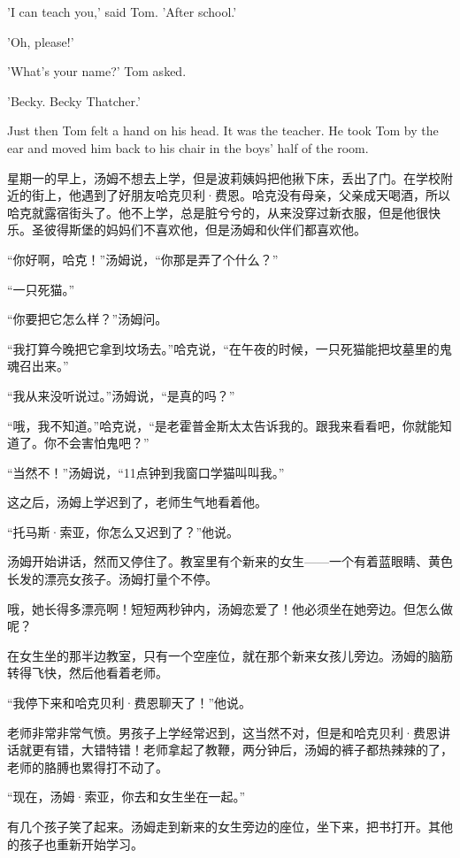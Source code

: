 \documentclass[fontset=ubuntu, zihao=5]{ctexart}
\begin{document}
\begin{paracol}{2}
'I can teach you,' said Tom. 'After school.'



'Oh, please!'

'What's your name?' Tom asked.

'Becky. Becky Thatcher.'

Just then Tom felt a hand on his head. It was the teacher. He took Tom by the ear and moved him back to his chair in the boys' half of the room.

\switchcolumn

\sectionbreak

星期一的早上，汤姆不想去上学，但是波莉姨妈把他揪下床，丢出了门。在学校附近的街上，他遇到了好朋友哈克贝利·费恩。哈克没有母亲，父亲成天喝酒，所以哈克就露宿街头了。他不上学，总是脏兮兮的，从来没穿过新衣服，但是他很快乐。圣彼得斯堡的妈妈们不喜欢他，但是汤姆和伙伴们都喜欢他。

“你好啊，哈克！”汤姆说，“你那是弄了个什么？”

“一只死猫。”

“你要把它怎么样？”汤姆问。

“我打算今晚把它拿到坟场去。”哈克说，“在午夜的时候，一只死猫能把坟墓里的鬼魂召出来。”

“我从来没听说过。”汤姆说，“是真的吗？”

“哦，我不知道。”哈克说，“是老霍普金斯太太告诉我的。跟我来看看吧，你就能知道了。你不会害怕鬼吧？”

“当然不！”汤姆说，“11点钟到我窗口学猫叫叫我。”

这之后，汤姆上学迟到了，老师生气地看着他。

“托马斯·索亚，你怎么又迟到了？”他说。

汤姆开始讲话，然而又停住了。教室里有个新来的女生——一个有着蓝眼睛、黄色长发的漂亮女孩子。汤姆打量个不停。

哦，她长得多漂亮啊！短短两秒钟内，汤姆恋爱了！他必须坐在她旁边。但怎么做呢？

在女生坐的那半边教室，只有一个空座位，就在那个新来女孩儿旁边。汤姆的脑筋转得飞快，然后他看着老师。

“我停下来和哈克贝利·费恩聊天了！”他说。

老师非常非常气愤。男孩子上学经常迟到，这当然不对，但是和哈克贝利·费恩讲话就更有错，大错特错！老师拿起了教鞭，两分钟后，汤姆的裤子都热辣辣的了，老师的胳膊也累得打不动了。

“现在，汤姆·索亚，你去和女生坐在一起。”

有几个孩子笑了起来。汤姆走到新来的女生旁边的座位，坐下来，把书打开。其他的孩子也重新开始学习。


\end{paracol}
\end{document}
